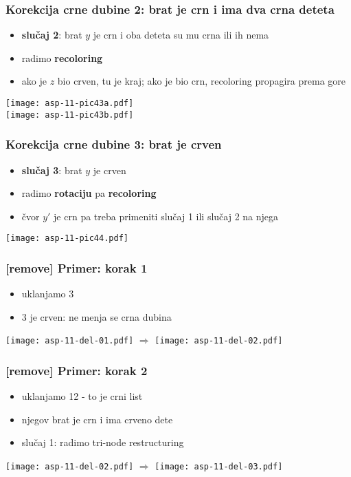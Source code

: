 \documentclass[compress,aspectratio=169]{beamer}
\begin{document}
\begin{frame}[fragile]
  \frametitle{Korekcija crne dubine 2: brat je crn i ima dva crna deteta}  
  \begin{itemize}
    \item \textbf{slučaj 2}: brat $y$ je crn i oba deteta su mu crna ili ih nema
    \item radimo \textbf{recoloring}
    \item ako je $z$ bio crven, tu je kraj; ako je bio crn, recoloring propagira prema gore
  \end{itemize}
  \begin{center}
    \texttt{[image: asp-11-pic43a.pdf]} \\
    \texttt{[image: asp-11-pic43b.pdf]} \\
  \end{center}
\end{frame}

\begin{frame}[fragile]
  \frametitle{Korekcija crne dubine 3: brat je crven}
  \begin{itemize}
    \item \textbf{slučaj 3}: brat $y$ je crven
    \item radimo \textbf{rotaciju} pa \textbf{recoloring}
    \item čvor $y'$ je crn pa treba primeniti slučaj 1 ili slučaj 2 na njega
  \end{itemize}
  \begin{center}
    \texttt{[image: asp-11-pic44.pdf]}
  \end{center}
\end{frame}

\begin{frame}[fragile]
  \frametitle{[remove] Primer: korak 1}
  \begin{itemize}
    \item uklanjamo 3
    \item 3 je crven: ne menja se crna dubina
  \end{itemize}
  \begin{center}
    \texttt{[image: asp-11-del-01.pdf]} $\Rightarrow$
    \texttt{[image: asp-11-del-02.pdf]}
  \end{center}
\end{frame}

\begin{frame}[fragile]
  \frametitle{[remove] Primer: korak 2}
  \begin{itemize}
    \item uklanjamo 12 - to je crni list
    \item njegov brat je crn i ima crveno dete
    \item slučaj 1: radimo tri-node restructuring
  \end{itemize}
  \begin{center}
    \texttt{[image: asp-11-del-02.pdf]} $\Rightarrow$
    \texttt{[image: asp-11-del-03.pdf]}
  \end{center}
\end{frame}
\end{document}

